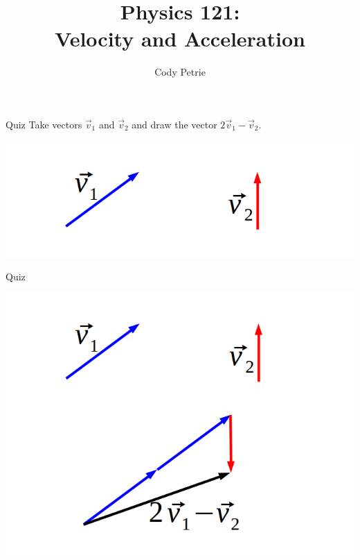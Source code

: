 \documentclass{beamer}
\title[{\color{white}{Chapters 1.4-5}}]{Physics 121: \\ Velocity and Acceleration}
\author{Cody Petrie}
\institute{Mesa Community College}
\date{}
\begin{document}
\begin{frame}
\titlepage
\end{frame}



\begin{frame}{Quiz}
Take vectors $\vec{v}_1$ and $\vec{v}_2$ and draw the vector $2\vec{v}_1-\vec{v}_2$.
\begin{center}
\includegraphics[width=\textwidth]{../figures/1_4-5Quiz.png}
\end{center}
\end{frame}

\begin{frame}{Quiz}
\begin{center}
\includegraphics[width=\textwidth]{../figures/1_4-5QuizAns.png}
\end{center}
\end{frame}
\end{document}
